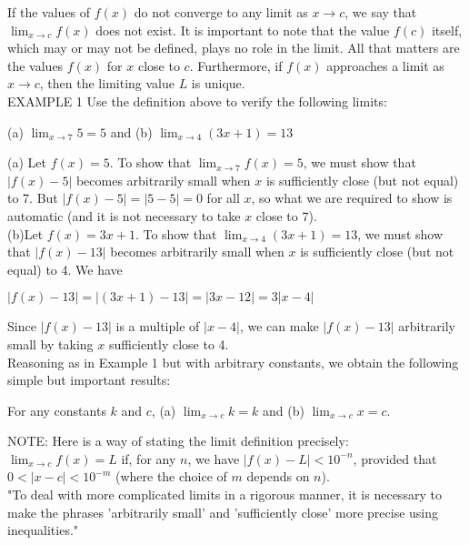 \documentclass{article}
\begin{document}
If the values of $f(x)$ do not converge to any limit as $x \to c$, we say that $\lim_{x \to c}f(x)$ does not exist. It is important to note that the value $f(c)$ itself, which may or may not be defined, plays no role in the limit. All that matters are the values $f(x)$ for $x$ close to $c$. Furthermore, if $f(x)$ approaches a limit as $x \to c$, then the limiting value $L$ is unique.\\

EXAMPLE 1 Use the definition above to verify the following limits:
\begin{center}
(a) $\lim_{x \to 7}5 = 5$ and (b) $\lim_{x \to 4}(3x + 1) = 13$
\end{center}
(a) Let $f(x) = 5$. To show that $\lim_{x \to 7}f(x) = 5$, we must show that $\left|f(x) - 5\right|$ becomes arbitrarily small when $x$ is sufficiently close (but not equal) to 7. But $\left|f(x)-5\right| = \left|5 - 5\right| = 0$ for all $x$, so what we are required to show is automatic (and it is not necessary to take $x$ close to 7).\\

\noindent(b)Let $f(x) = 3x+1$. To show that $\lim_{x \to 4}(3x + 1) = 13$, we must show that $\left|f(x) - 13\right|$ becomes arbitrarily small when $x$ is sufficiently close (but not equal) to 4. We have
\begin{center}$\left|f(x) - 13\right| = \left|(3x+1) - 13\right| = \left|3x - 12\right| = 3\left|x - 4\right|$\end{center}
Since $\left|f(x) - 13\right|$ is a multiple of $\left|x - 4\right|$, we can make $\left|f(x) - 13\right|$ arbitrarily small by taking $x$ sufficiently close to 4.\\

Reasoning as in Example 1 but with arbitrary constants, we obtain the following simple but important results:
\begin{center}For any constants $k$ and $c$, (a) $\lim_{x \to c}k = k$ and (b) $\lim_{x \to c}x = c$.\end{center}

NOTE: Here is a way of stating the limit definition precisely:\\
$\lim_{x \to c}f(x) = L$ if, for any $n$, we have $\left|f(x) -  L\right| < 10^{-n}$, provided that $0 < \left|x - c\right| < 10^{-m}$ (where the choice of $m$ depends on $n$).\\

"To deal with more complicated limits in a rigorous manner, it is necessary to make the phrases 'arbitrarily small' and 'sufficiently close' more precise using inequalities."\\
\end{document}
